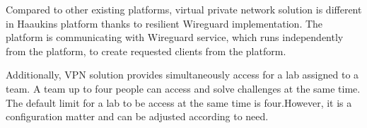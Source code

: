Compared to other existing platforms, virtual private network solution is different in Haaukins platform thanks to resilient Wireguard implementation. The platform is communicating with Wireguard service, which runs independently from the platform, to create requested clients from the platform. 

Additionally, VPN solution provides simultaneously access for a lab assigned to a team. A team up to four people can access and solve challenges at the same time. The default limit for a lab to be access at the same time is four.However, it is a configuration matter and can be adjusted according to need. 


